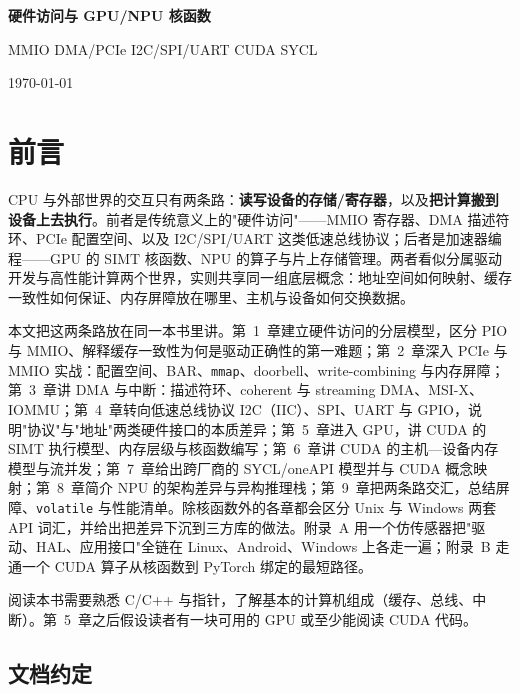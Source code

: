 \documentclass[12pt,a4paper,fontset=fandol]{ctexbook}
\newcommand{\cpp}[1]{C++#1}
\newcommand{\kw}[1]{\texttt{#1}}
\begin{document}
\frontmatter

\begin{titlepage}
\centering
\vspace*{3cm}
{\Huge\bfseries\color{algheadbg} 硬件访问与 GPU/NPU 核函数\par}
\vspace{1cm}
{\LARGE\color{blue!70!black} MMIO \textbullet{} DMA/PCIe \textbullet{} I2C/SPI/UART \textbullet{} CUDA \textbullet{} SYCL\par}
\vfill
{\large\color{gray} \today\par}
\end{titlepage}

\chapter*{前\quad 言}

CPU 与外部世界的交互只有两条路：\textbf{读写设备的存储/寄存器}，以及\textbf{把计算搬到设备上去执行}。前者是传统意义上的"硬件访问"——MMIO 寄存器、DMA 描述符环、PCIe 配置空间、以及 I2C/SPI/UART 这类低速总线协议；后者是加速器编程——GPU 的 SIMT 核函数、NPU 的算子与片上存储管理。两者看似分属驱动开发与高性能计算两个世界，实则共享同一组底层概念：地址空间如何映射、缓存一致性如何保证、内存屏障放在哪里、主机与设备如何交换数据。

本文把这两条路放在同一本书里讲。第~1~章建立硬件访问的分层模型，区分 PIO 与 MMIO、解释缓存一致性为何是驱动正确性的第一难题；第~2~章深入 PCIe 与 MMIO 实战：配置空间、BAR、\texttt{mmap}、doorbell、write-combining 与内存屏障；第~3~章讲 DMA 与中断：描述符环、coherent 与 streaming DMA、MSI-X、IOMMU；第~4~章转向低速总线协议 I2C（IIC）、SPI、UART 与 GPIO，说明"协议"与"地址"两类硬件接口的本质差异；第~5~章进入 GPU，讲 CUDA 的 SIMT 执行模型、内存层级与核函数编写；第~6~章讲 CUDA 的主机—设备内存模型与流并发；第~7~章给出跨厂商的 SYCL/oneAPI 模型并与 CUDA 概念映射；第~8~章简介 NPU 的架构差异与异构推理栈；第~9~章把两条路交汇，总结屏障、\kw{volatile} 与性能清单。除核函数外的各章都会区分 Unix 与 Windows 两套 API 词汇，并给出把差异下沉到三方库的做法。附录~A 用一个仿传感器把"驱动、HAL、应用接口"全链在 Linux、Android、Windows 上各走一遍；附录~B 走通一个 CUDA 算子从核函数到 PyTorch 绑定的最短路径。

阅读本书需要熟悉 C/\allowbreak{}\cpp{} 与指针，了解基本的计算机组成（缓存、总线、中断）。第~5~章之后假设读者有一块可用的 GPU 或至少能阅读 CUDA 代码。

\section*{文档约定}
\end{document}
